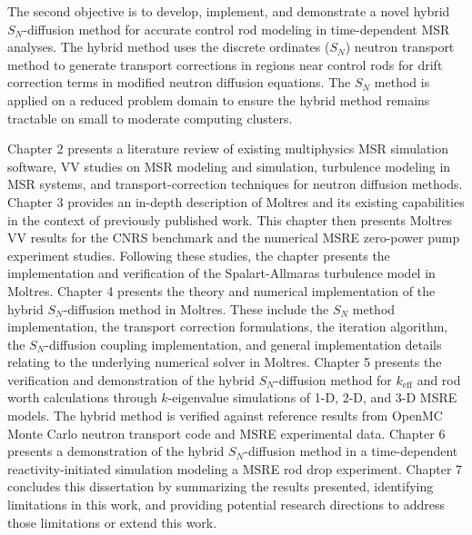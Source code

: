     The second objective is to develop, implement, and demonstrate a novel hybrid $S_N$-diffusion
    method for accurate control rod modeling in
    time-dependent \gls{MSR} analyses. The hybrid method uses the discrete ordinates ($S_N$)
    neutron transport method to generate transport corrections in regions near control rods for
    drift correction terms in modified neutron diffusion equations. The $S_N$ method is applied on
    a reduced problem domain to ensure the hybrid method remains tractable on small to moderate
    computing clusters.

Chapter 2 presents a literature review of existing multiphysics \gls{MSR} simulation software,
\gls{VV} studies on \gls{MSR} modeling and simulation, turbulence modeling in \gls{MSR} systems,
and transport-correction techniques for neutron diffusion methods.
Chapter 3 provides an in-depth description of Moltres and its existing capabilities in the context
of previously published work. This chapter then presents Moltres \gls{VV} results for the CNRS
benchmark and the numerical \gls{MSRE} zero-power pump experiment studies. Following these studies,
the chapter presents the implementation and verification of the Spalart-Allmaras turbulence model
in Moltres.
Chapter 4 presents the theory and numerical implementation of the hybrid
$S_N$-diffusion method in Moltres. These include the $S_N$ method implementation, the transport
correction formulations, the iteration algorithm, the $S_N$-diffusion coupling implementation, and
general implementation details relating to the underlying numerical solver in Moltres.
Chapter 5 presents the verification and demonstration of the hybrid $S_N$-diffusion method for
$k_\text{eff}$ and rod worth calculations through
$k$-eigenvalue simulations of 1-D, 2-D, and 3-D \gls{MSRE} models. The hybrid method is verified
against reference results from OpenMC Monte Carlo neutron transport code and \gls{MSRE}
experimental data.
Chapter 6 presents a demonstration of the hybrid $S_N$-diffusion method in a time-dependent
reactivity-initiated simulation modeling a \gls{MSRE} rod drop experiment.
Chapter 7 concludes this dissertation by summarizing the results presented, identifying limitations
in this work, and providing potential research directions to address those limitations or extend
this work.
